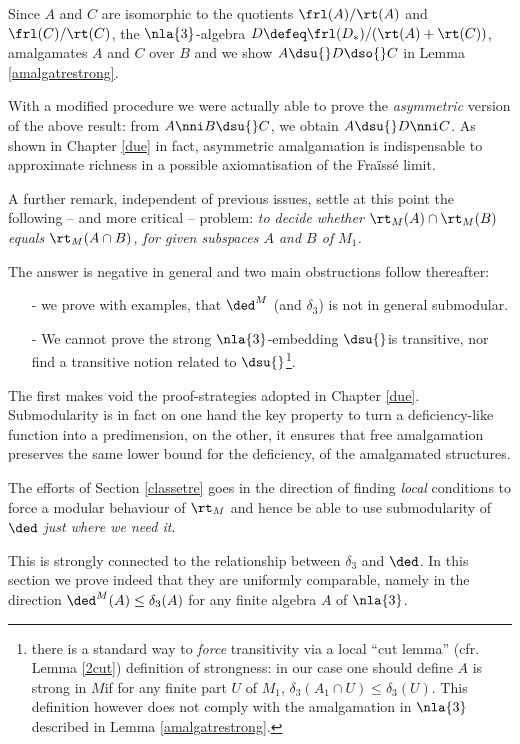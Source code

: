 Since $A$ and $C$ are isomorphic to the quotients $\frl(A)/\rt(A)$ and $\frl(C)/\rt(C)$, the $\nla{3}$-algebra
$D\defeq\frl(D_{*})/(\rt(A)+\rt(C))$, amalgamates $A$ and $C$ over $B$ and we show $A\dsu{} D\dso{}C$ in
Lemma \ref{amalgatrestrong}.

With a modified procedure we were actually able to prove the {\em asymmetric} version of the above result: from
$A\nni B\dsu{} C$, we obtain $A\dsu{} D\nni C$.
As shown in Chapter \ref{due} in fact, asymmetric amalgamation is indispensable
to approximate richness in a possible axiomatisation of the Fra\"iss\'e limit.


\medskip
A further remark, independent of previous issues, settle at this point the following -- and more critical -- problem:
{\sl to decide whether $\rt_{M}(A)\cap\rt_{M}(B)$ equals $\rt_{M}(A\cap B)$, for given subspaces $A$ and $B$ of $M_{1}$.}

The answer is negative in general and two main obstructions follow thereafter:
\begin{itemize}
\item[-]we prove with examples, that $\ded^{M}$ (and $\delta_{3}$) is not in general submodular.
\item[-]We cannot prove the strong $\nla{3}$-embedding $\dsu{}$is transitive, nor find a transitive notion related to
$\dsu{}$\footnote{
there is a standard way to {\em force} transitivity via a local ``cut lemma'' (cfr. Lemma \ref{2cut}) definition of strongness: in our case
one should define \lqq $A$ is strong in $M$\rqq if for any finite part $U$ of $M_{1}$, $\delta_{3}(A_{1}\cap U)\leq\delta_{3}(U)$.
This definition however does not comply with the amalgamation in $\nla{3}$ described in Lemma \ref{amalgatrestrong}.
}.
\end{itemize}
The first makes void the proof-strategies adopted in Chapter \ref{due}. Submodularity %
is in fact on one hand the key property to turn a deficiency-like function into a predimension,
on the other, it ensures that free amalgamation preserves the same lower bound
for the deficiency, of the amalgamated structures. 

\smallskip
The efforts of Section \ref{classetre}
goes in the direction of finding {\em local} conditions to force a modular behaviour of $\rt_{M}$ and hence be able to
use submodularity of $\ded$ {\sl just where we need it}.

This is strongly connected to the relationship between $\delta_{3}$ and $\ded$. In this
section we prove indeed that they are uniformly comparable, namely in the direction $\ded^{M}(A)\leq\delta_{3}(A)$ for
any finite algebra $A$ of $\nla{3}$.

